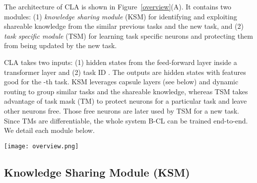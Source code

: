 \documentclass[11pt]{article}
\begin{document}
The architecture of CLA is shown in Figure~\ref{overview}(A). It contains two modules: (1) \textit{knowledge sharing module} (KSM) for identifying and exploiting shareable knowledge from the similar previous tasks and the new task, and (2) \textit{task specific module} (TSM) for learning task specific neurons and protecting them from being updated by the new task. 

CLA takes two inputs: 
(1) hidden states  from the feed-forward layer inside a transformer layer and (2) task ID .
The outputs are hidden states with features good for the -th task. KSM leverages capsule layers (see below) and dynamic routing to group similar tasks and the shareable knowledge, whereas
TSM takes advantage of task mask (TM) to protect neurons for a particular task and leave other neurons free. Those free neurons are later used by TSM for a new task.
Since TMs are differentiable, the {\color{black}whole system B-CL can be trained end-to-end.}
We detail each module below.




\begin{figure*}[t]
\centering
\texttt{[image: overview.png]}
\caption{(A) Architecture of CLA: the skip-connection is not shown for clarity. (B) illustration of task masking: a (learnable) task mask is applied after the activation function to \textit{selectively} activate a neuron (or feature). Some
notes about (B) are: the two rows of each task corresponds to  and  in TSM. In the cells 
before training, those with 0’s are the neurons to be protected (masked) and those
cells without a number are free neurons (not used). In the cells after training, those cells with 1’s show
neurons that are important for the current task, which are used as a mask for the future. Those cells with more than one color indicate that they are shared by more than one task. Those 0 cells without a color are not used by any task.}
\vspace{-2mm}
\label{overview}
\end{figure*}



\subsection{Knowledge Sharing Module (KSM)}
\label{sec:task_sharing}
\vspace{-0.5mm}
\end{document}

